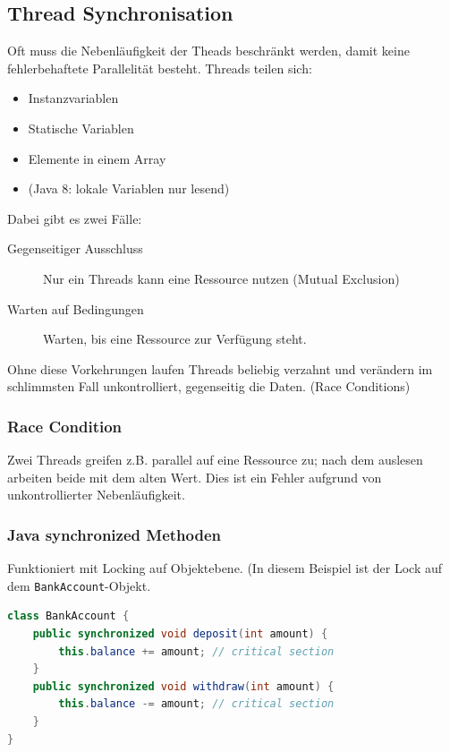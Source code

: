 \subsection{Thread Synchronisation}

Oft muss die Nebenläufigkeit der Theads beschränkt werden, damit keine fehlerbehaftete Parallelität besteht. Threads teilen sich:
\begin{itemize}
	\item Instanzvariablen
	\item Statische Variablen
	\item Elemente in einem Array
	\item (Java 8: lokale Variablen nur lesend)
\end{itemize}

Dabei gibt es zwei Fälle:

\begin{description}
	\item[Gegenseitiger Ausschluss] Nur ein Threads kann eine Ressource nutzen (Mutual Exclusion)
	\item[Warten auf Bedingungen] Warten, bis eine Ressource zur Verfügung steht.
\end{description}

Ohne diese Vorkehrungen laufen Threads beliebig verzahnt und verändern im schlimmsten Fall unkontrolliert, gegenseitig die Daten. (Race Conditions)

\subsubsection{Race Condition}

Zwei Threads greifen z.B. parallel auf eine Ressource zu; nach dem auslesen arbeiten beide mit dem alten Wert.
Dies ist ein Fehler aufgrund von unkontrollierter Nebenläufigkeit.

\subsubsection{Java synchronized Methoden}

Funktioniert mit Locking auf Objektebene. (In diesem Beispiel ist der Lock auf dem \lstinline|BankAccount|-Objekt.

\begin{lstlisting}[language=java]
class BankAccount {
	public synchronized void deposit(int amount) {
		this.balance += amount; // critical section
	}
	public synchronized void withdraw(int amount) {
		this.balance -= amount; // critical section
	}
}
\end{lstlisting}

